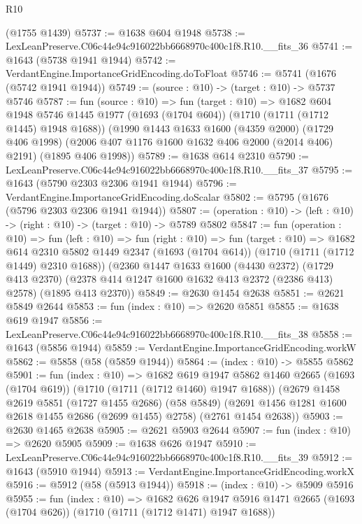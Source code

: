\begin{lexlean}{R10}
\begin{coremodule}
    (@1755 @1439)
@5737 := @1638 @604 @1948
@5738 := LexLeanPreserve.C06c44e94c916022bb6668970c400c1f8.R10.__fits_36
@5741 := @1643 (@5738 @1941 @1944)
@5742 := VerdantEngine.ImportanceGridEncoding.doToFloat
@5746 := @5741 (@1676 (@5742 @1941 @1944))
@5749 := (source : @10) -> (target : @10) -> @5737 @5746
@5787 := fun (source : @10) =>
  fun (target : @10) =>
  @1682
    @604
    @1948
    @5746
    @1445
    @1977
    (@1693 (@1704 @604))
    (@1710 (@1711 (@1712 @1445) @1948 @1688))
    (@1990
      @1443
      @1633
      @1600
      (@4359 @2000)
      (@1729 @406 @1998)
      (@2006 @407 @1176 @1600 @1632 @406 @2000 (@2014 @406) @2191)
      (@1895 @406 @1998))
@5789 := @1638 @614 @2310
@5790 := LexLeanPreserve.C06c44e94c916022bb6668970c400c1f8.R10.__fits_37
@5795 := @1643 (@5790 @2303 @2306 @1941 @1944)
@5796 := VerdantEngine.ImportanceGridEncoding.doScalar
@5802 := @5795 (@1676 (@5796 @2303 @2306 @1941 @1944))
@5807 := (operation : @10) -> (left : @10) -> (right : @10) -> (target : @10) -> @5789 @5802
@5847 := fun (operation : @10) =>
  fun (left : @10) =>
  fun (right : @10) =>
  fun (target : @10) =>
  @1682
    @614
    @2310
    @5802
    @1449
    @2347
    (@1693 (@1704 @614))
    (@1710 (@1711 (@1712 @1449) @2310 @1688))
    (@2360
      @1447
      @1633
      @1600
      (@4430 @2372)
      (@1729 @413 @2370)
      (@2378 @414 @1247 @1600 @1632 @413 @2372 (@2386 @413) @2578)
      (@1895 @413 @2370))
@5849 := @2630 @1454 @2638
@5851 := @2621 @5849 @2644
@5853 := fun (index : @10) => @2620 @5851
@5855 := @1638 @619 @1947
@5856 := LexLeanPreserve.C06c44e94c916022bb6668970c400c1f8.R10.__fits_38
@5858 := @1643 (@5856 @1944)
@5859 := VerdantEngine.ImportanceGridEncoding.workW
@5862 := @5858 (@58 (@5859 @1944))
@5864 := (index : @10) -> @5855 @5862
@5901 := fun (index : @10) =>
  @1682
    @619
    @1947
    @5862
    @1460
    @2665
    (@1693 (@1704 @619))
    (@1710 (@1711 (@1712 @1460) @1947 @1688))
    (@2679
      @1458
      @2619
      @5851
      (@1727 @1455 @2686)
      (@58 @5849)
      (@2691 @1456 @1281 @1600 @2618 @1455 @2686 (@2699 @1455) @2758)
      (@2761 @1454 @2638))
@5903 := @2630 @1465 @2638
@5905 := @2621 @5903 @2644
@5907 := fun (index : @10) => @2620 @5905
@5909 := @1638 @626 @1947
@5910 := LexLeanPreserve.C06c44e94c916022bb6668970c400c1f8.R10.__fits_39
@5912 := @1643 (@5910 @1944)
@5913 := VerdantEngine.ImportanceGridEncoding.workX
@5916 := @5912 (@58 (@5913 @1944))
@5918 := (index : @10) -> @5909 @5916
@5955 := fun (index : @10) =>
  @1682
    @626
    @1947
    @5916
    @1471
    @2665
    (@1693 (@1704 @626))
    (@1710 (@1711 (@1712 @1471) @1947 @1688))

\end{coremodule}
\end{lexlean}
